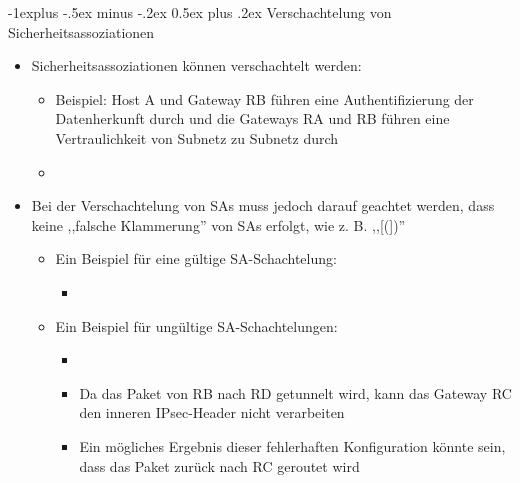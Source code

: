 \documentclass[a4paper]{article}
\makeatletter
\renewcommand{\subsection}{\@startsection{subsection}{2}{0mm}%
 {-1explus -.5ex minus -.2ex}%
 {0.5ex plus .2ex}%
 {\normalfont\normalsize\bfseries}}
\makeatother
\begin{document}
\begin{multicols}{3}
    \subsection{Verschachtelung von
        Sicherheitsassoziationen}

    \begin{itemize}
        \item
              Sicherheitsassoziationen können verschachtelt werden:

              \begin{itemize}
                  \item
                        Beispiel: Host A und Gateway RB führen eine Authentifizierung der
                        Datenherkunft durch und die Gateways RA und RB führen eine
                        Vertraulichkeit von Subnetz zu Subnetz durch
                  \item
              \end{itemize}
        \item
              Bei der Verschachtelung von SAs muss jedoch darauf geachtet werden,
              dass keine ,,falsche Klammerung'' von SAs erfolgt, wie z. B.
              ,,{[}({]})''

              \begin{itemize}
                  \item
                        Ein Beispiel für eine gültige SA-Schachtelung:

                        \begin{itemize}
                            \item
                        \end{itemize}
                  \item
                        Ein Beispiel für ungültige SA-Schachtelungen:

                        \begin{itemize}
                            \item
                            \item
                                  Da das Paket von RB nach RD getunnelt wird, kann das Gateway RC
                                  den inneren IPsec-Header nicht verarbeiten
                            \item
                                  Ein mögliches Ergebnis dieser fehlerhaften Konfiguration könnte
                                  sein, dass das Paket zurück nach RC geroutet wird
                        \end{itemize}
              \end{itemize}
    \end{itemize}



\end{multicols}
\end{document}
